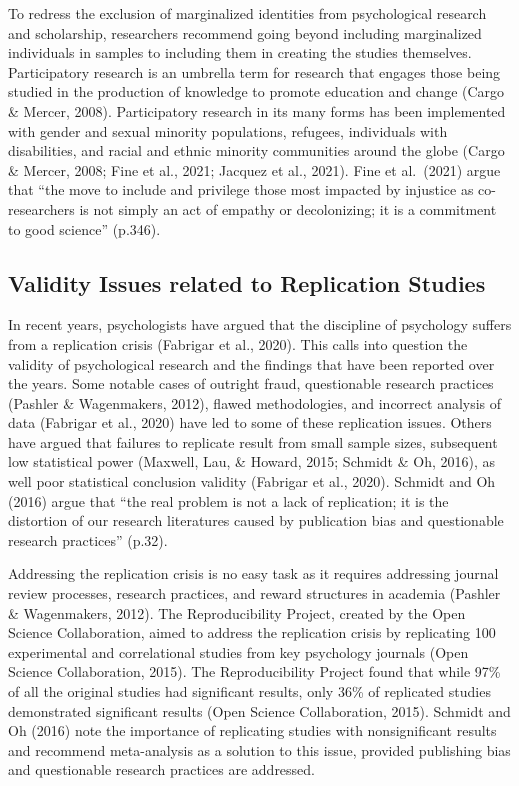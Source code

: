 \documentclass[
  11pt,
]{book}
\begin{document}
To redress the exclusion of marginalized identities from psychological research and scholarship, researchers recommend going beyond including marginalized individuals in samples to including them in creating the studies themselves. Participatory research is an umbrella term for research that engages those being studied in the production of knowledge to promote education and change (Cargo \& Mercer, 2008). Participatory research in its many forms has been implemented with gender and sexual minority populations, refugees, individuals with disabilities, and racial and ethnic minority communities around the globe (Cargo \& Mercer, 2008; Fine et al., 2021; Jacquez et al., 2021). Fine et al.~(2021) argue that ``the move to include and privilege those most impacted by injustice as co-researchers is not simply an act of empathy or decolonizing; it is a commitment to good science'' (p.346).

\hypertarget{validity-issues-related-to-replication-studies}{%
\subsection{Validity Issues related to Replication Studies}\label{validity-issues-related-to-replication-studies}}

In recent years, psychologists have argued that the discipline of psychology suffers from a replication crisis (Fabrigar et al., 2020). This calls into question the validity of psychological research and the findings that have been reported over the years. Some notable cases of outright fraud, questionable research practices (Pashler \& Wagenmakers, 2012), flawed methodologies, and incorrect analysis of data (Fabrigar et al., 2020) have led to some of these replication issues. Others have argued that failures to replicate result from small sample sizes, subsequent low statistical power (Maxwell, Lau, \& Howard, 2015; Schmidt \& Oh, 2016), as well poor statistical conclusion validity (Fabrigar et al., 2020). Schmidt and Oh (2016) argue that ``the real problem is not a lack of replication; it is the distortion of our research literatures caused by publication bias and questionable research practices'' (p.32).

Addressing the replication crisis is no easy task as it requires addressing journal review processes, research practices, and reward structures in academia (Pashler \& Wagenmakers, 2012). The Reproducibility Project, created by the Open Science Collaboration, aimed to address the replication crisis by replicating 100 experimental and correlational studies from key psychology journals (Open Science Collaboration, 2015). The Reproducibility Project found that while 97\% of all the original studies had significant results, only 36\% of replicated studies demonstrated significant results (Open Science Collaboration, 2015). Schmidt and Oh (2016) note the importance of replicating studies with nonsignificant results and recommend meta-analysis as a solution to this issue, provided publishing bias and questionable research practices are addressed.
\end{document}
